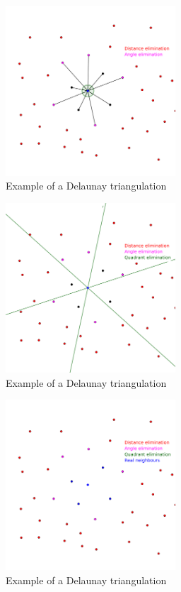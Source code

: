 \documentclass[lettersize,journal,english]{IEEEtran}
\begin{document}
\begin{figure}[!t]
    \centering
    \includegraphics[width=2.5in]{images/illus_crit/angle_elim.png}
    \caption{Example of a Delaunay triangulation}
    \label{crit_ang}
\end{figure}

\begin{figure}[!b]
    \centering
    \includegraphics[width=2.5in]{images/illus_crit/quadrant_elim.png}
    \caption{Example of a Delaunay triangulation}
    \label{crit_qua}
\end{figure}

\begin{figure}[!t]
    \centering
    \includegraphics[width=2.5in]{images/illus_crit/neighs.png}
    \caption{Example of a Delaunay triangulation}
    \label{crit_nei}
\end{figure}
\end{document}
